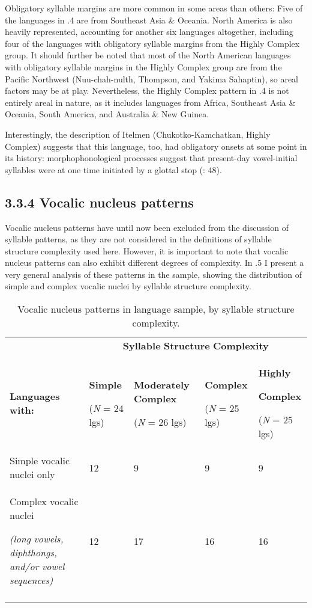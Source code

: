   Obligatory syllable margins are more common in some areas than others: Five of the languages in .4 are from Southeast Asia \& Oceania. North America is also heavily represented, accounting for another six languages altogether, including four of the languages with obligatory syllable margins from the Highly Complex group. It should further be noted that most of the North American languages with obligatory syllable margins in the Highly Complex group are from the Pacific Northwest (Nuu-chah-nulth, Thompson, and Yakima Sahaptin), so areal factors may be at play. Nevertheless, the Highly Complex pattern in .4 is not entirely areal in nature, as it includes languages from Africa, Southeast Asia \& Oceania, South America, and Australia \& New Guinea. 

  Interestingly, the description of Itelmen (Chukotko-Kamchatkan, Highly Complex) suggests that this language, too, had obligatory onsets at some point in its history: morphophonological processes suggest that present-day vowel-initial syllables were at one time initiated by a glottal stop (\citealt{GeorgVolodin1999}: 48).

\subsection{3.3.4 Vocalic nucleus patterns}

  Vocalic nucleus patterns have until now been excluded from the discussion of syllable patterns, as they are not considered in the definitions of syllable structure complexity used here. However, it is important to note that vocalic nucleus patterns can also exhibit different degrees of complexity. In .5 I present a very general analysis of these patterns in the sample, showing the distribution of simple and complex vocalic nuclei by syllable structure complexity.

\begin{table}
\begin{tabularx}{\textwidth}{XXXXX}
 & \multicolumn{4}{c}{ \textbf{Syllable} \textbf{Structure} \textbf{Complexity}}\\
\lsptoprule
 \textbf{Languages} \textbf{with:} & { \textbf{Simple}}

 (\textit{N} = 24 lgs) & { \textbf{Moderately} \textbf{Complex}}

 (\textit{N} = 26 lgs) & { \textbf{Complex}}

 (\textit{N} = 25 lgs) & { \textbf{Highly} }

{ \textbf{Complex}}

 (\textit{N} = 25 lgs)\\
 Simple vocalic nuclei only & 12 & 9 & 9 & 9\\
{ Complex vocalic nuclei} 

 \textit{(long} \textit{vowels,} \textit{diphthongs,} \textit{and/or} \textit{vowel} \textit{sequences)} & 12 & 17 & 16 & 16\\
\lspbottomrule
\end{tabularx}
\caption{\label{3.5}Vocalic nucleus patterns in language sample, by syllable structure complexity.}
\end{table}

